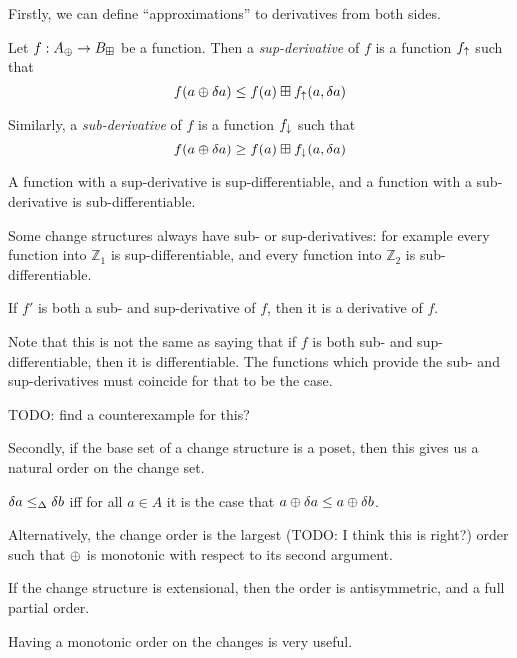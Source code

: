 Firstly, we can define ``approximations'' to derivatives from both sides.

\begin{defn}
  Let $f: A_\oplus \rightarrow B_\boxplus$ be a function. Then a \textit{sup-derivative}
  of $f$ is a function $f_\uparrow$ such that
  $$f(a \oplus \delta a) \leq f(a) \boxplus f_\uparrow(a, \delta a)$$
  
  Similarly, a \textit{sub-derivative} of $f$ is a function $f_\downarrow$ such that 
  $$f(a \oplus \delta a) \geq f(a) \boxplus f_\downarrow(a, \delta a)$$

  A function with a sup-derivative is sup-differentiable, and a function with a
  sub-derivative is sub-differentiable.
\end{defn}

Some change structures always have sub- or sup-derivatives: for example every function
into $\mathbb{Z}_1$ is sup-differentiable, and every function into $\mathbb{Z}_2$ is 
sub-differentiable.

\begin{prop}
  If $f'$ is both a sub- and sup-derivative of $f$, then it is a derivative of $f$.
\end{prop}

Note that this is not the same as saying that if $f$ is both sub- and
sup-differentiable, then it is differentiable. The functions which provide the
sub- and sup-derivatives must coincide for that to be the case.

TODO: find a counterexample for this?

Secondly, if the base set of a change structure is a poset, then this gives us a natural
order on the change set.

\begin{defn}
  $\delta a \leq_\Delta \delta b$ iff for all $a \in A$ it is the case that $a \oplus \delta a \leq a \oplus \delta b$.
\end{defn}

Alternatively, the change order is the largest (TODO: I think this is right?) order such that $\oplus$ is monotonic with
respect to its second argument.

If the change structure is extensional, then the order is antisymmetric, and a
full partial order.

Having a monotonic order on the changes is very useful.

